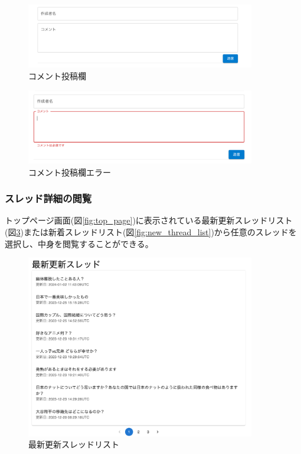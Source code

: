 \documentclass[b5paper,12pt,dvipdfmx]{jsreport}
\begin{document}
\begin{figure}[H]
	\centering
    \includegraphics[width=100mm,height=28.19mm]{./img/feature/comment_textfield.png}
	\caption{コメント投稿欄}
	\label{fig:comment_textfield}
\end{figure}

\begin{figure}[H]
	\centering
    \includegraphics[width=100mm,height=32.90mm]{./img/feature/comment_textfield_error.png}
	\caption{コメント投稿欄エラー}
	\label{fig:comment_textfield_error}
\end{figure}

\subsubsection{スレッド詳細の閲覧}
トップページ画面(図\ref{fig:top_page})に表示されている最新更新スレッドリスト(図\ref{fig:latest_update_thread_list})または新着スレッドリスト(図\ref{fig:new_thread_list})から任意のスレッドを選択し、中身を閲覧することができる。

\begin{figure}[H]
	\centering
    \includegraphics[width=100mm,height=79.79mm]{./img/feature/latest_update_thread_list.png}
	\caption{最新更新スレッドリスト}
	\label{fig:latest_update_thread_list}
\end{figure}
\end{document}
